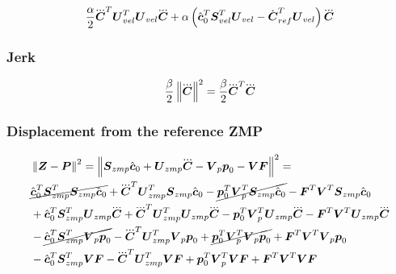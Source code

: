 \begin{equation*}
    \frac{\alpha}{2} \cJerk^T \M{U}_{vel}^T \M{U}_{vel} \cJerk  
    +  
    \alpha 
    \left(
        \cstate_0^T \M{S}_{vel}^T \M{U}_{vel}
        -
        \cVel_{ref}^T \M{U}_{vel} 
    \right)
    \cJerk 
\end{equation*}

\subsubsection{Jerk}
\begin{equation*}
    \frac{\beta}{2}  \norm{\cJerk}^2 = \frac{\beta}{2} \cJerk^T \cJerk
\end{equation*}

\subsubsection{Displacement from the reference ZMP}
\begin{equation*}
\begin{split}
    &\norm{\ZMP - \FP}^2 = 
    \norm{\M{S}_{zmp} \cstate_0 + \M{U}_{zmp} \cJerk  -  \M{V}_p \fp_0 - \M{V} \FD} ^ 2 = \\
%
%
    &
    \cancel{\cstate_0^T \M{S}_{zmp}^T \M{S}_{zmp} \cstate_0} 
    + \cJerk^T \M{U}_{zmp}^T \M{S}_{zmp} \cstate_0
    - \cancel{\fp_0^T \M{V}_p^T \M{S}_{zmp} \cstate_0}
    - \FD^T \M{V}^T \M{S}_{zmp} \cstate_0 \\
    &
    + \cstate_0^T \M{S}_{zmp}^T \M{U}_{zmp} \cJerk 
    + \cJerk^T \M{U}_{zmp}^T \M{U}_{zmp} \cJerk
    - \fp_0^T \M{V}_p^T \M{U}_{zmp} \cJerk
    - \FD^T \M{V}^T \M{U}_{zmp} \cJerk\\
    &
    - \cancel{\cstate_0^T \M{S}_{zmp}^T \M{V}_p \fp_0}
    - \cJerk^T \M{U}_{zmp}^T \M{V}_p \fp_0
    + \cancel{\fp_0^T \M{V}_p^T \M{V}_p \fp_0}
    + \FD^T \M{V}^T \M{V}_p \fp_0\\
    &
    - \cstate_0^T \M{S}_{zmp}^T \M{V} \FD
    - \cJerk^T \M{U}_{zmp}^T \M{V} \FD
    + \fp_0^T \M{V}_p^T \M{V} \FD
    + \FD^T \M{V}^T \M{V} \FD\\
\end{split}
\end{equation*}

